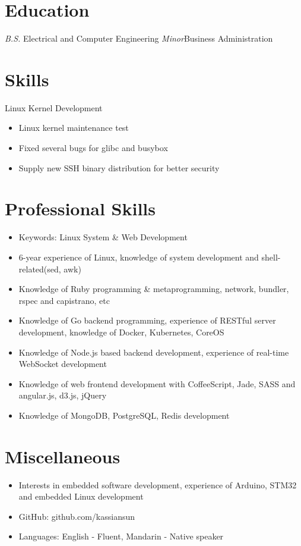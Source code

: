 \documentclass{resume}
\begin{document}


\section{Education}
\textit{B.S.} Electrical and Computer Engineering
\textit{Minor}Business Administration

\section{Skills}


Linux Kernel Development
\begin{itemize}
    \item Linux kernel maintenance test
    \item Fixed several bugs for glibc and busybox
    \item Supply new SSH binary distribution for better security
\end{itemize}
\section{Professional Skills}
\begin{itemize}[parsep=0.5ex]
    \item Keywords: Linux System \& Web Development
    \item 6-year experience of Linux, knowledge of system development and shell-related(sed, awk)
    \item Knowledge of Ruby programming \& metaprogramming, network, bundler, rspec and capistrano, etc
    \item Knowledge of Go backend programming, experience of RESTful server development, knowledge of Docker, Kubernetes, CoreOS
    \item Knowledge of Node.js based backend development, experience of real-time WebSocket development
    \item Knowledge of web frontend development with CoffeeScript, Jade, SASS and angular.js, d3.js, jQuery
    \item Knowledge of MongoDB, PostgreSQL, Redis development
\end{itemize}
\section{Miscellaneous}
\begin{itemize}[parsep=0.5ex]
    \item Interests in embedded software development, experience of Arduino, STM32 and embedded Linux development
    \item GitHub: github.com/kassiansun
    \item Languages: English - Fluent, Mandarin - Native speaker
\end{itemize}
\end{document}
